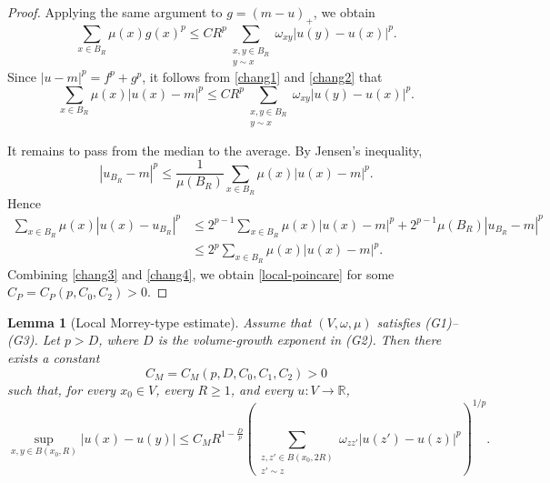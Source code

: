 \documentclass[twoside,12pt,letter]{article}
\theoremstyle{plain}
\newtheorem{lemma}[theorem]{Lemma}
\theoremstyle{definition}
\theoremstyle{remark}
\numberwithin{equation}{section}
\begin{document}
\begin{proof}
Applying the same argument to \(g=(m-u)_+\), we obtain
\begin{equation}\label{chang2}
\sum_{x\in B_R}\mu(x)g(x)^p
\le
C R^p
\sum_{\substack{x,y\in B_R\\ y\sim x}}
\omega_{xy}|u(y)-u(x)|^p.
\end{equation}
Since \(|u-m|^p=f^p+g^p\), it follows from \eqref{chang1} and \eqref{chang2} that
\begin{equation}\label{chang3}
\sum_{x\in B_R}\mu(x)|u(x)-m|^p
\le
C R^p
\sum_{\substack{x,y\in B_R\\ y\sim x}}
\omega_{xy}|u(y)-u(x)|^p.
\end{equation}

It remains to pass from the median to the average. By Jensen's inequality,
\[
|u_{B_R}-m|^p
\le
\frac{1}{\mu(B_R)}
\sum_{x\in B_R}\mu(x)|u(x)-m|^p.
\]
Hence
\begin{equation}\label{chang4}
\begin{aligned}
\sum_{x\in B_R}\mu(x)|u(x)-u_{B_R}|^p
&\le
2^{p-1}\sum_{x\in B_R}\mu(x)|u(x)-m|^p
+
2^{p-1}\mu(B_R)|u_{B_R}-m|^p  \\
&\le
2^p
\sum_{x\in B_R}\mu(x)|u(x)-m|^p.
\end{aligned}
\end{equation}
Combining \eqref{chang3} and \eqref{chang4}, we
obtain \eqref{local-poincare} for some \(C_P=C_P(p,C_0,C_2)>0\).
\end{proof}

\begin{lemma}[Local Morrey-type estimate]\label{lem-local-morrey}
Assume that \((V,\omega,\mu)\) satisfies {\rm(G1)}--{\rm(G3)}. Let
\(p>D\), where \(D\) is the volume-growth exponent in {\rm(G2)}. Then there
exists a constant
\[
C_M=C_M(p,D,C_0,C_1,C_2)>0
\]
such that, for every \(x_0\in V\), every \(R\ge 1\), and every
\(u:V\to\mathbb{R}\),
\begin{equation}\label{Morrey-ineq}
\sup_{x,y\in B(x_0,R)} |u(x)-u(y)|
\le
C_M R^{1-\frac{D}{p}}
\left(
\sum_{\substack{z,z'\in B(x_0,2R)\\ z'\sim z}}
\omega_{zz'}|u(z')-u(z)|^p
\right)^{1/p}.
\end{equation}
\end{lemma}
\end{document}
